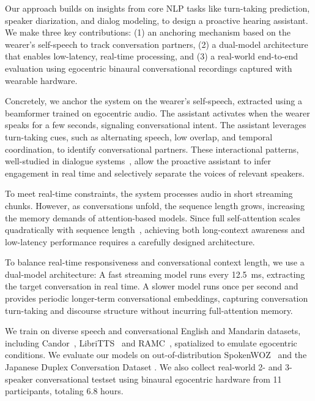 Our approach builds on insights from core NLP tasks like turn-taking prediction, speaker diarization, and dialog modeling, to design a proactive hearing assistant. We make three key contributions:
(1) an anchoring mechanism based on the wearer’s self-speech to track conversation partners,
(2) a dual-model architecture that enables low-latency, real-time processing, and
(3) a real-world end-to-end evaluation using egocentric binaural conversational recordings captured with wearable hardware.


Concretely, we anchor the system on the wearer’s self-speech, extracted using a beamformer trained on egocentric audio. The assistant activates when the wearer speaks  for a few seconds, signaling conversational intent. The assistant leverages  turn-taking cues, such as alternating speech, low overlap, and temporal coordination, to identify conversational partners. These interactional patterns, well-studied in dialogue systems~\cite{turntake2,frontiers,tce}, allow the proactive assistant to infer engagement in real time and selectively separate the voices of relevant speakers.


To meet real-time constraints, the system processes audio in short streaming chunks. However, as conversations unfold, the sequence length grows, increasing the memory demands of attention-based models. Since full self-attention scales quadratically with sequence length~\cite{ainslie2020etcencodinglongstructured,10889061}, achieving both long-context awareness and low-latency performance requires a carefully designed architecture.



To balance real-time responsiveness and conversational context length, we use a dual-model architecture:  A fast streaming model runs every 12.5~ms, extracting the target conversation in real time. A slower  model runs once per second  and provides periodic longer-term conversational embeddings, capturing conversation turn-taking and discourse structure without incurring full-attention memory.




We train on diverse speech and conversational English and Mandarin datasets, including  Candor~\cite{candor}, LibriTTS~\cite{zen2019libritts} and RAMC~\cite{ramc}, spatialized to emulate egocentric conditions. We evaluate our models on out-of-distribution  SpokenWOZ~\cite{si2023spokenwoz} and the Japanese Duplex Conversation Dataset \cite{JapaneseDuplex2025}. We also collect real-world  2- and 3-speaker conversational testset using binaural egocentric hardware from 11 participants, totaling 6.8 hours.

